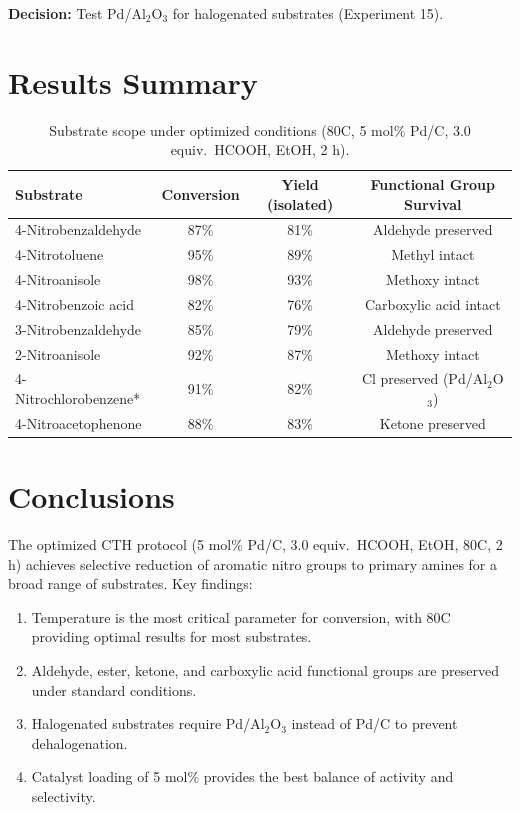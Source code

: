 \documentclass[
    language=english,
    doctype=experiment-log,
    institution=none,
]{../../omnilatex}
\begin{document}
\textbf{Decision:} Test Pd/Al$_2$O$_3$ for halogenated substrates (Experiment 15).

\section{Results Summary}
\label{sec:results}

\begin{table}[htbp]
    \centering
    \caption{Substrate scope under optimized conditions (80\degree C, 5 mol\% Pd/C,
             3.0 equiv.\ HCOOH, EtOH, 2 h).}
    \label{tab:scope}
    \begin{tabular}{@{}lccc@{}}
        \toprule
        Substrate & Conversion & Yield (isolated) & Functional Group Survival \\
        \midrule
        4-Nitrobenzaldehyde & 87\% & 81\% & Aldehyde preserved \\
        4-Nitrotoluene & 95\% & 89\% & Methyl intact \\
        4-Nitroanisole & 98\% & 93\% & Methoxy intact \\
        4-Nitrobenzoic acid & 82\% & 76\% & Carboxylic acid intact \\
        3-Nitrobenzaldehyde & 85\% & 79\% & Aldehyde preserved \\
        2-Nitroanisole & 92\% & 87\% & Methoxy intact \\
        4-Nitrochlorobenzene* & 91\% & 82\% & Cl preserved (Pd/Al$_2$O$_3$) \\
        4-Nitroacetophenone & 88\% & 83\% & Ketone preserved \\
        \bottomrule
    \end{tabular}
\end{table}

\section{Conclusions}
\label{sec:conclusions}

The optimized CTH protocol (5 mol\% Pd/C, 3.0 equiv.\ HCOOH, EtOH,
80\degree C, 2 h) achieves selective reduction of aromatic nitro groups
to primary amines for a broad range of substrates. Key findings:

\begin{enumerate}
    \item Temperature is the most critical parameter for conversion, with
          80\degree C providing optimal results for most substrates.
    \item Aldehyde, ester, ketone, and carboxylic acid functional groups
          are preserved under standard conditions.
    \item Halogenated substrates require Pd/Al$_2$O$_3$ instead of Pd/C
          to prevent dehalogenation.
    \item Catalyst loading of 5 mol\% provides the best balance of
          activity and selectivity.
\end{enumerate}
\end{document}
